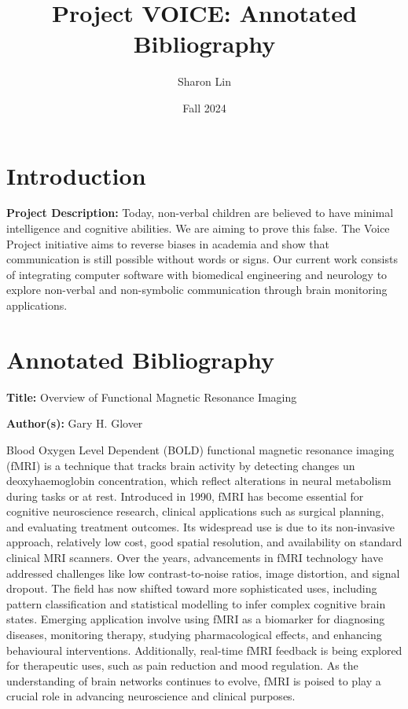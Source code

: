 \documentclass[12pt, research paper]{report}
\title{Project VOICE: Annotated Bibliography}
\author{Sharon Lin}
\date{Fall 2024}
\begin{document}
	
	\maketitle
	
	\section*{Introduction}
	
	\noindent\textbf{Project Description:} Today, non-verbal children are believed to have minimal intelligence and cognitive abilities. We are aiming to prove this false. The Voice Project initiative aims to reverse biases in academia and show that communication is still possible without words or signs. Our current work consists of integrating computer software with biomedical engineering and neurology to explore non-verbal and non-symbolic communication through brain monitoring applications.
	
	\vspace{10pt}
	
	\section*{Annotated Bibliography} 
	\textbf{Title:} Overview of Functional Magnetic Resonance Imaging
	
	\noindent \textbf{Author(s):} Gary H. Glover
	\bigskip 
	
	Blood Oxygen Level Dependent (BOLD) functional magnetic resonance imaging (fMRI) is a technique that tracks brain activity by detecting changes un deoxyhaemoglobin concentration, which reflect alterations in neural metabolism during tasks or at rest. Introduced in 1990, fMRI has become essential for cognitive neuroscience research, clinical applications such as surgical planning, and evaluating treatment outcomes. Its widespread use is due to its non-invasive approach, relatively low cost, good spatial resolution, and availability on standard clinical MRI scanners. Over the years, advancements in fMRI technology have addressed challenges like low contrast-to-noise ratios, image distortion, and signal dropout. The field has now shifted toward more sophisticated uses, including pattern classification and statistical modelling to infer complex cognitive brain states. Emerging application involve using fMRI as a biomarker for diagnosing diseases, monitoring therapy, studying pharmacological effects, and enhancing behavioural interventions. Additionally, real-time fMRI feedback is being explored for therapeutic uses, such as pain reduction and mood regulation. As the understanding of brain networks continues to evolve, fMRI is poised to play a crucial role in advancing neuroscience and clinical purposes.
	\bigskip
	
\end{document}
